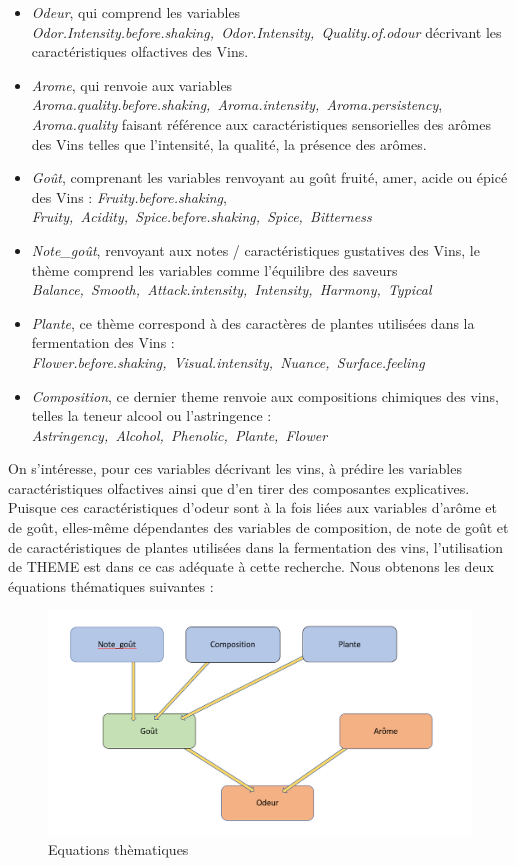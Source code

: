 \documentclass[a4paper,french,10pt]{article}
\begin{document}
\begin{itemize}
	\item \textit{Odeur}, qui comprend les variables \textit{Odor.Intensity.before.shaking,~Odor.Intensity,~Quality.of.odour} décrivant les caractéristiques olfactives des Vins. 
	\item \textit{Arome}, qui renvoie aux variables \textit{Aroma.quality.before.shaking,~Aroma.intensity,~Aroma.persistency}, \textit{Aroma.quality} faisant référence aux caractéristiques sensorielles des arômes des Vins telles que l'intensité, la qualité, la présence des arômes. 
	\item \textit{Goût}, comprenant les variables renvoyant au goût fruité, amer, acide ou épicé des Vins : \textit{Fruity.before.shaking}, \textit{Fruity,~Acidity,~Spice.before.shaking,~Spice,~Bitterness}
	\item \textit{Note\_goût}, renvoyant aux notes / caractéristiques gustatives des Vins, le thème comprend les variables comme l'équilibre des saveurs \textit{Balance,~Smooth,~Attack.intensity,~Intensity,~Harmony,~Typical}
	\item \textit{Plante}, ce thème correspond à des caractères de plantes utilisées dans la fermentation des Vins : \textit{Flower.before.shaking,~Visual.intensity,~Nuance,~Surface.feeling}
	\item \textit{Composition}, ce dernier theme renvoie aux compositions chimiques des vins, telles la teneur alcool ou l'astringence : \textit{Astringency,~Alcohol,~Phenolic,~Plante,~Flower}
\end{itemize} 

\bigskip

On s'intéresse, pour ces variables décrivant les vins, à prédire les variables caractéristiques olfactives ainsi que d'en tirer des composantes explicatives. Puisque ces caractéristiques d'odeur sont à la fois liées aux variables d'arôme et de goût, elles-même dépendantes des variables de composition, de note de goût et de caractéristiques de plantes utilisées dans la fermentation des vins, l'utilisation de THEME est dans ce cas adéquate à cette recherche. Nous obtenons les deux équations thématiques suivantes : 

\begin{figure}[htp] 
	\centering
	\includegraphics[scale=0.45]{images/Eq_THEME.png}
	\caption{Equations thèmatiques}
\end{figure}
\end{document}
